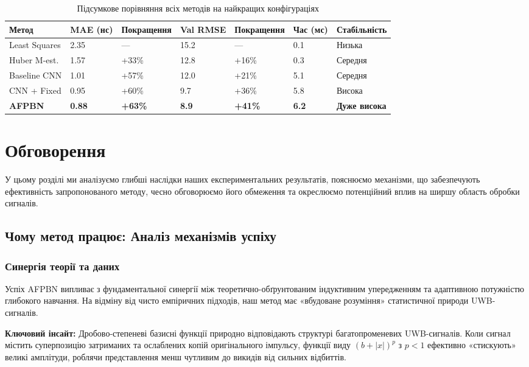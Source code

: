\documentclass[12pt,a4paper]{article}
\begin{document}
\begin{table}[htbp]
	\centering
	\caption{Підсумкове порівняння всіх методів на найкращих конфігураціях}
	\label{tab:final_comparison}
	\begin{tabular}{@{}p{2.5cm}p{1.8cm}p{2cm}p{1.8cm}p{2cm}p{1.5cm}p{2cm}@{}}
		\toprule
		\textbf{Метод} & \textbf{MAE (нс)} & \textbf{Покращення} & \textbf{Val RMSE} & \textbf{Покращення} & \textbf{Час (мс)} & \textbf{Стабільність} \\
		\midrule
		Least Squares & 2.35 & — & 15.2 & — & 0.1 & Низька \\
		Huber M-est. & 1.57 & +33\% & 12.8 & +16\% & 0.3 & Середня \\
		Baseline CNN & 1.01 & +57\% & 12.0 & +21\% & 5.1 & Середня \\
		CNN + Fixed & 0.95 & +60\% & 9.7 & +36\% & 5.8 & Висока \\
		\textbf{AFPBN} & \textbf{0.88} & \textbf{+63\%} & \textbf{8.9} & \textbf{+41\%} & \textbf{6.2} & \textbf{Дуже висока} \\
		\bottomrule
	\end{tabular}
\end{table}
	
\section{Обговорення}
\label{sec:discussion}

У цьому розділі ми аналізуємо глибші наслідки наших експериментальних результатів, пояснюємо механізми, що забезпечують ефективність запропонованого методу, чесно обговорюємо його обмеження та окреслюємо потенційний вплив на ширшу область обробки сигналів.

\subsection{Чому метод працює: Аналіз механізмів успіху}

\subsubsection{Синергія теорії та даних}

Успіх AFPBN випливає з фундаментальної синергії між теоретично-обґрунтованим індуктивним упередженням та адаптивною потужністю глибокого навчання. На відміну від чисто емпіричних підходів, наш метод має «вбудоване розуміння» статистичної природи UWB-сигналів.

\textbf{Ключовий інсайт:} Дробово-степеневі базисні функції природно відповідають структурі багатопроменевих UWB-сигналів. Коли сигнал містить суперпозицію затриманих та ослаблених копій оригінального імпульсу, функції виду $(b + |x|)^p$ з $p < 1$ ефективно «стискують» великі амплітуди, роблячи представлення менш чутливим до викидів від сильних відбиттів.
\end{document}
